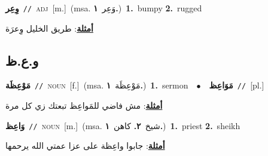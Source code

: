 \documentclass[10pt,a4paper,twoside]{article} %
\begin{document}
\begin{multicols}{2}
{\setlength\topsep{0pt}\textbf{\foreignlanguage{arabic}{وِعِر}}\ {\color{gray}\texttt{//}\color{black}}\ \textsc{adj}\ [m.]\ \color{gray}(msa. \foreignlanguage{arabic}{وَعِر}~\foreignlanguage{arabic}{\textbf{١.}})\color{black}\ \textbf{1.}~bumpy  \textbf{2.}~rugged\  \begin{flushright}\color{gray}\foreignlanguage{arabic}{\textbf{\underline{\foreignlanguage{arabic}{أمثلة}}}: طريق الخليل وِعرَة}\end{flushright}\color{black}} \vspace{2mm}

\vspace{-3mm}
\subsection*{\color{blue}\foreignlanguage{arabic}{و.ع.ظ}\color{blue}{}} 

{\setlength\topsep{0pt}\textbf{\foreignlanguage{arabic}{مَوْعِظَة}}\ {\color{gray}\texttt{//}\color{black}}\ \textsc{noun}\ [f.]\ \color{gray}(msa. \foreignlanguage{arabic}{مَوْعِظَة}~\foreignlanguage{arabic}{\textbf{١.}})\color{black}\ \textbf{1.}~sermon\ \ $\bullet$\ \ \setlength\topsep{0pt}\textbf{\foreignlanguage{arabic}{مَوَاعِظ}}\ {\color{gray}\texttt{//}\color{black}}\ [pl.]\  \begin{flushright}\color{gray}\foreignlanguage{arabic}{\textbf{\underline{\foreignlanguage{arabic}{أمثلة}}}: مش فاضي للمَواعِظ تبعتك زي كل مرة}\end{flushright}\color{black}} \vspace{2mm}

{\setlength\topsep{0pt}\textbf{\foreignlanguage{arabic}{وَاعِظ}}\ {\color{gray}\texttt{//}\color{black}}\ \textsc{noun}\ [m.]\ \color{gray}(msa. \foreignlanguage{arabic}{شيخ}~\foreignlanguage{arabic}{\textbf{٢.}}  \foreignlanguage{arabic}{كاهن}~\foreignlanguage{arabic}{\textbf{١.}})\color{black}\ \textbf{1.}~priest  \textbf{2.}~sheikh\  \begin{flushright}\color{gray}\foreignlanguage{arabic}{\textbf{\underline{\foreignlanguage{arabic}{أمثلة}}}: جابوا واعِظة على عزا عمتي الله يرحمها}\end{flushright}\color{black}} \vspace{2mm}


\end{multicols}
\end{document}
